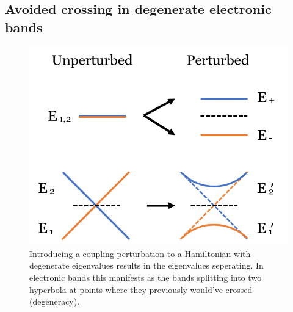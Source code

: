 \documentclass[12pt]{report} %
\begin{document}
\subsection*{Avoided crossing in degenerate electronic bands}

\begin{figure}[t!]
\centering
\includegraphics[width=0.6\columnwidth]{splitting_bands_diagram.png}
  \caption{Introducing a coupling perturbation to a Hamiltonian with degenerate eigenvalues results in the eigenvalues seperating. In electronic bands this manifests as the bands splitting into two hyperbola at points where they previously would've crossed (degeneracy).}
  \label{splitting_bands}
\end{figure}
\end{document}
